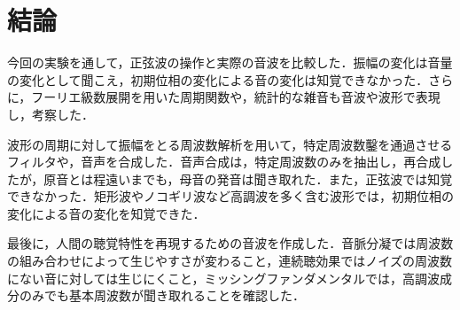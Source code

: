 \chapter{結論}
今回の実験を通して，正弦波の操作と実際の音波を比較した．振幅の変化は音量の変化として聞こえ，初期位相の変化による音の変化は知覚できなかった．さらに，フーリエ級数展開を用いた周期関数や，統計的な雑音も音波や波形で表現し，考察した．\par
波形の周期に対して振幅をとる周波数解析を用いて，特定周波数鑿を通過させるフィルタや，音声を合成した．音声合成は，特定周波数のみを抽出し，再合成したが，原音とは程遠いまでも，母音の発音は聞き取れた．また，正弦波では知覚できなかった．矩形波やノコギリ波など高調波を多く含む波形では，初期位相の変化による音の変化を知覚できた．\par
最後に，人間の聴覚特性を再現するための音波を作成した．音脈分凝では周波数の組み合わせによって生じやすさが変わること，連続聴効果ではノイズの周波数にない音に対しては生じにくこと，ミッシングファンダメンタルでは，高調波成分のみでも基本周波数が聞き取れることを確認した．